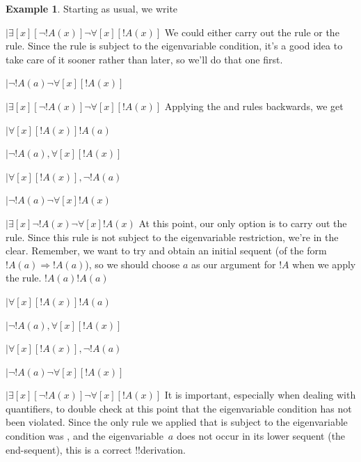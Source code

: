 \documentclass[10pt,a4paper]{article}
\theoremstyle{plain}
\theoremstyle{definition}
\newtheorem{ex}[thm]{Example}
\theoremstyle{remark}
\providecommand{\AxiomC}[1]{}
\providecommand{\RightLabel}[1]{}
\providecommand{\fCenter}{}
\newenvironment{prooftree}{}{}
\providecommand{\lforall}{\mathord{\forall}}
\providecommand{\lexists}{\mathord{\exists}}
\providecommand{\Sequent}{\mathrel{\Rightarrow}}
\providecommand{\LeftR}[1]{}
\providecommand{\RightR}[1]{}
\providecommand{\UnaryInf}{\ensuremath{\mid}}
\providecommand{\RightR}{\mathrm{R}}
\providecommand{\LeftR}{\mathrm{L}}
\providecommand{\Axiom}{\mathrm{Ax}}
\begin{document}
\begin{ex}
Starting as usual, we write
\begin{prooftree}
\AxiomC{}
\UnaryInf$\lexists[x][\lnot !A(x)] \fCenter \lnot \lforall[x][!A(x)]$
\end{prooftree}
We could either carry out the \LeftR{\exists} rule or the \RightR{\lnot}
rule. Since the \LeftR{\exists} rule is subject to the eigenvariable
condition, it's a good idea to take care of it sooner rather than
later, so we'll do that one first.
\begin{prooftree}
\AxiomC{}
\UnaryInf$ \lnot !A(a) \fCenter \lnot \lforall[x][!A(x)]$
\RightLabel{\LeftR{\lexists}}
\UnaryInf$ \lexists[x][\lnot !A(x)] \fCenter \lnot \lforall[x][!A(x)]$
\end{prooftree}
Applying the \LeftR{\lnot} and \RightR{\lnot} rules backwards, we get
\begin{prooftree}
\AxiomC{}
\UnaryInf$\lforall[x][!A(x)] \fCenter !A(a)$
\RightLabel{\LeftR{\lnot}}
\UnaryInf$\lnot !A(a), \lforall[x][!A(x)] \fCenter $
\RightLabel{\LeftR{\Exchange}}
\UnaryInf$\lforall[x][!A(x)], \lnot !A(a) \fCenter $
\RightLabel{\RightR{\lnot}}
\UnaryInf$ \lnot !A(a) \fCenter \lnot \lforall[x] !A(x)$
\RightLabel{\LeftR{\lexists}}
\UnaryInf$ \lexists[x] \lnot !A(x) \fCenter \lnot \lforall[x] !A(x)$
\end{prooftree}
At this point, our only option is to carry out the \LeftR{\forall}
rule. Since this rule is not subject to the eigenvariable restriction,
we're in the clear. Remember, we want to try and obtain an initial
sequent (of the form $!A(a) \Sequent !A(a)$), so we should choose $a$
as our argument for $!A$ when we apply the rule.
\begin{prooftree}
\Axiom$!A(a) \fCenter !A(a)$
\RightLabel{\LeftR{\lforall}}
\UnaryInf$\lforall[x][!A(x)] \fCenter !A(a)$
\RightLabel{\LeftR{\lnot}}
\UnaryInf$\lnot !A(a), \lforall[x][!A(x)] \fCenter $
\RightLabel{\LeftR{\Exchange}}
\UnaryInf$\lforall[x][!A(x)], \lnot !A(a) \fCenter $
\RightLabel{\RightR{\lnot}}
\UnaryInf$ \lnot !A(a) \fCenter \lnot \lforall[x][!A(x)]$
\RightLabel{\LeftR{\lexists}}
\UnaryInf$ \lexists[x][ \lnot !A(x)] \fCenter \lnot \lforall[x][!A(x)]$
\end{prooftree}
It is important, especially when dealing with quantifiers, to double
check at this point that the eigenvariable condition has not been
violated. Since the only rule we applied that is subject to the
eigenvariable condition was \LeftR{\exists}, and the eigenvariable~$a$
does not occur in its lower sequent (the end-sequent), this is a
correct !!{derivation}.
\end{ex}
\end{document}
